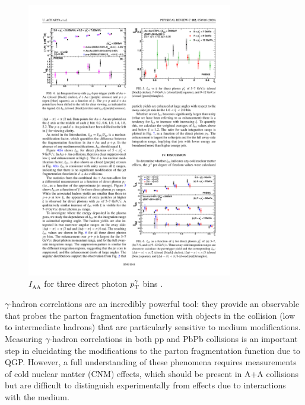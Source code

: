 \begin{figure}[htpb]
  \centering
  \includegraphics[width=0.8\textwidth]{Introduction/phenix_gh_IAA.pdf}
  \caption{$I_\mathrm{AA}$ for three direct photon $p_{\mathrm{T}}^\gamma$ bins \cite{PHENIXCollaboration2020}.}
  \label{fig:phenix_gh_IAA}
\end{figure}


$\gamma$-hadron correlations are an incredibly powerful tool: they provide an observable that probes the parton fragmentation function with objects in the collision (low to intermediate \pt hadrons) that are particularly sensitive to medium modifications. Measuring $\gamma$-hadron correlations in both pp and PbPb collisions is an important step in elucidating the modifications to the parton fragmentation function due to QGP. However, a full understanding of these phenomena requires measurements of cold nuclear matter (CNM) effects, which should be present in A+A collisions but are difficult to distinguish experimentally from effects due to interactions with the medium.



